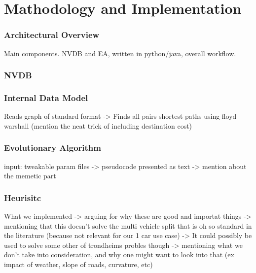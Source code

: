 \chapter{Mathodology and Implementation}

\subsection{Architectural Overview}
Main components. NVDB and EA, written in python/java, overall workflow.

\subsection{NVDB}

\subsection{Internal Data Model}
Reads graph of standard format -> Finds all pairs shortest paths using floyd warshall (mention the neat trick of including destination cost)

\subsection{Evolutionary Algorithm}
input: tweakable param files -> pseudocode presented as text -> mention about the memetic part

\subsection{Heurisitc}
What we implemented 
-> arguing for why these are good and importat things 
-> mentioning that this doesn't solve the multi vehicle split that is oh so standard in the literature (because not relevant for our 1 car use case) 
	-> It could possibly be used to solve some other of trondheims probles though 
-> mentioning what we don't take into consideration, and why one might want to look into that (ex impact of weather, slope of roads, curvature, etc)
